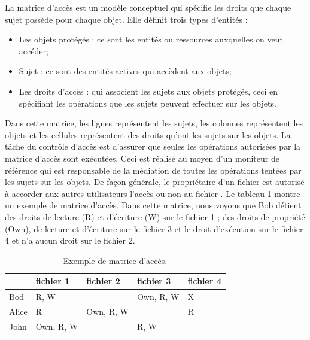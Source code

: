 La matrice d'accès est un modèle conceptuel qui spécifie les droits que chaque sujet possède pour chaque objet. Elle définit trois types d'entités \cite{rjaibi04} :
\begin{itemize}
\item Les objets protégés : ce sont les entités ou ressources auxquelles on veut accéder;
\item Sujet : ce sont des entités actives qui accèdent aux objets;
\item Les droits d'accès : qui associent les sujets aux objets protégés, ceci en spécifiant les opérations que les sujets peuvent effectuer sur les objets.
\end{itemize}
\hspace*{0.5cm} Dans cette matrice, les lignes représentent les sujets, les colonnes représentent les objets et les cellules représentent des droits qu'ont les sujets sur les objets. La tâche du contrôle d'accès est d'assurer que seules les opérations autorisées par la matrice d'accès sont exécutées. Ceci est réalisé au moyen d'un moniteur de référence qui est responsable de la médiation de toutes les opérations tentées par les sujets sur les objets. De façon générale, le propriétaire d'un fichier est autorisé à accorder aux autres utilisateurs l'accès ou non au fichier \cite{sandhu94}. Le tableau 1 montre un exemple de matrice d'accès. Dans cette matrice, nous voyons que Bob détient des droits de lecture (R) et d'écriture (W) sur le fichier 1 ; des droits de propriété  (Own), de lecture et d'écriture sur le fichier 3 et le droit d'exécution sur le fichier 4 et n'a aucun droit sur le fichier 2.

\begin{table}[ht]
	\centering
	\caption{ Exemple de matrice d'accès.}
	\label{tableau}
	{\scriptsize
		\begin{tabular}[t]{p{1.4cm}p{1.6cm}p{1.8cm}p{1.7cm}p{1.4cm}}
			\hline \hline
			& \textbf{fichier 1} & \textbf{fichier 2} & \textbf{fichier 3} & \textbf{fichier 4} \\
			\hline
			Bod  & R, W & & Own, R, W & X  \\
			\hline
			Alice  & R & Own, R, W & & R  \\
			\hline
			John  &Own, R, W & & R, W &  \\
			\hline
			 \hline
	\end{tabular}}
\end{table}


